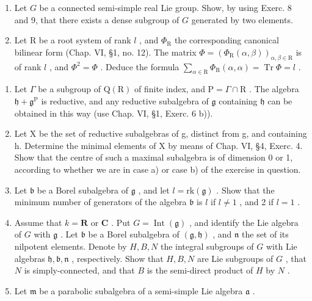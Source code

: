 \begin{enumerate}
\def\labelenumi{\arabic{enumi})}
\setcounter{enumi}{9}
\item
  Let \(G\) be a connected semi-simple real Lie group. Show, by using Exerc. 8 and 9, that there exists a dense subgroup of \(G\) generated by two elements.
\item
  Let \(\mathrm{R}\) be a root system of rank \(l\) , and \(\varPhi_{\mathrm{R}}\) the corresponding canonical bilinear form (Chap. VI, §1, no. 12). The matrix \(\varPhi = (\varPhi_{\mathrm{R}}(\alpha, \beta))_{\alpha, \beta \in \mathrm{R}}\) is of rank \(l\) , and \(\varPhi^2 = \varPhi\) . Deduce the formula \(\sum_{\alpha \in \mathrm{R}} \varPhi_{\mathrm{R}}(\alpha, \alpha) = \operatorname{Tr} \varPhi = l\) .
\end{enumerate}


\begin{enumerate}
\def\labelenumi{\arabic{enumi})}
\item
  Let \(\Gamma\) be a subgroup of \(\mathrm{Q}(\mathrm{R})\) of finite index, and \(\mathrm{P} = \Gamma \cap \mathrm{R}\) . The algebra \(\mathfrak{h} + \mathfrak{g}^{\mathrm{P}}\) is reductive, and any reductive subalgebra of \(\mathfrak{g}\) containing \(\mathfrak{h}\) can be obtained in this way (use Chap. VI, §1, Exerc. 6 b)).
\item
  Let X be the set of reductive subalgebras of g, distinct from g, and containing h. Determine the minimal elements of X by means of Chap. VI, §4, Exerc. 4. Show that the centre of such a maximal subalgebra is of dimension 0 or 1, according to whether we are in case a) or case b) of the exercise in question.
\item
  Let \(\mathfrak{b}\) be a Borel subalgebra of \(\mathfrak{g}\) , and let \(l = \mathrm{rk}(\mathfrak{g})\) . Show that the minimum number of generators of the algebra \(\mathfrak{b}\) is \(l\) if \(l \neq 1\) , and 2 if \(l = 1\) .
\item
  Assume that \(k = \mathbf{R}\) or \(\mathbf{C}\) . Put \(G = \operatorname{Int}(\mathfrak{g})\) , and identify the Lie algebra of \(G\) with \(\mathfrak{g}\) . Let \(\mathfrak{b}\) be a Borel subalgebra of \((\mathfrak{g},\mathfrak{h})\) , and \(\mathfrak{n}\) the set of its nilpotent elements. Denote by \(H,B,N\) the integral subgroups of \(G\) with Lie algebras \(\mathfrak{h},\mathfrak{b},\mathfrak{n}\) , respectively. Show that \(H,B,N\) are Lie subgroups of \(G\) , that \(N\) is simply-connected, and that \(B\) is the semi-direct product of \(H\) by \(N\) .
\item
  Let \(\mathfrak{m}\) be a parabolic subalgebra of a semi-simple Lie algebra \(\mathfrak{a}\) .
\end{enumerate}

